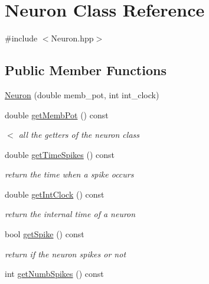 \hypertarget{classNeuron}{\section{Neuron Class Reference}
\label{classNeuron}
}


{\ttfamily \#include $<$Neuron.\-hpp$>$}

\subsection*{Public Member Functions}
\begin{DoxyCompactItemize}
\item 
\hyperlink{classNeuron_abf1d01ba351a1c39d692ea3ab41e9fe4}{Neuron} (double memb\-\_\-pot, int int\-\_\-clock)
\item 
double \hyperlink{classNeuron_a2d5813a910d37557ab9ff24d04d75a4f}{get\-Memb\-Pot} () const 
\begin{DoxyCompactList}\small\item\em $<$ all the getters of the neuron class \end{DoxyCompactList}\item 
\hypertarget{classNeuron_a13b7bf51bf586b16137dd16cf746d05d}{double \hyperlink{classNeuron_a13b7bf51bf586b16137dd16cf746d05d}{get\-Time\-Spikes} () const }\label{classNeuron_a13b7bf51bf586b16137dd16cf746d05d}

\begin{DoxyCompactList}\small\item\em return the time when a spike occurs \end{DoxyCompactList}\item 
\hypertarget{classNeuron_aa4a694d78c83c9302481c6054004cd38}{double \hyperlink{classNeuron_aa4a694d78c83c9302481c6054004cd38}{get\-Int\-Clock} () const }\label{classNeuron_aa4a694d78c83c9302481c6054004cd38}

\begin{DoxyCompactList}\small\item\em return the internal time of a neuron \end{DoxyCompactList}\item 
\hypertarget{classNeuron_a9c7aefda240dcf3ebdfc946c4e5925d7}{bool \hyperlink{classNeuron_a9c7aefda240dcf3ebdfc946c4e5925d7}{get\-Spike} () const }\label{classNeuron_a9c7aefda240dcf3ebdfc946c4e5925d7}

\begin{DoxyCompactList}\small\item\em return if the neuron spikes or not \end{DoxyCompactList}\item 
\hypertarget{classNeuron_ae68be71d47b724a7f7f3121712cdc9fc}{int \hyperlink{classNeuron_ae68be71d47b724a7f7f3121712cdc9fc}{get\-Numb\-Spikes} () const }\label{classNeuron_ae68be71d47b724a7f7f3121712cdc9fc}


\end{DoxyCompactItemize}
